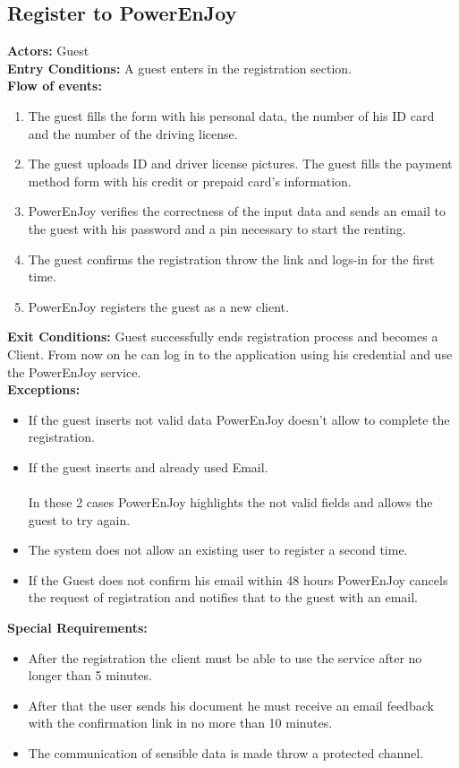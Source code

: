 \subsection{Register to PowerEnJoy}
%
\textbf{Actors:}
Guest\\
%
\textbf{Entry Conditions:}
A guest enters in the registration section.\\ 
%
\textbf{Flow of events:}
\begin{enumerate}
\item The guest fills the form with his personal data, the number of his ID card and the number of the driving license. 
\item The guest uploads ID and driver license pictures. The guest fills the payment method form with his credit or prepaid card's information. 
\item PowerEnJoy verifies the correctness of the input data and sends an email to the guest with his password and a pin necessary to start the renting. 
\item The guest confirms the registration throw the link and logs-in for the first time.
\item PowerEnJoy registers the guest as a new client. 
\end{enumerate}
%
\textbf{Exit Conditions:}
Guest successfully ends registration process and becomes a Client. From now on he can log in to the application using his credential and use the PowerEnJoy service. \\ 
%
\textbf{Exceptions:}
\begin{itemize}
\item If the guest inserts not valid data PowerEnJoy doesn't allow to complete the registration.
\item If the guest inserts and already used Email.
\\
\\In these 2 cases PowerEnJoy highlights the not valid fields and allows the guest to try again.
\item The system does not allow an existing user to register a second time.
\item If the Guest does not confirm his email within 48 hours PowerEnJoy cancels the request of registration and notifies that to the guest with an email.
\end{itemize}
%
\textbf{Special Requirements:}
\begin{itemize}
\item After the registration the client must be able to use the service after no longer than 5 minutes.
\item After that the user sends his document he must receive an email feedback with the confirmation link in no more than 10 minutes.
\item The communication of sensible data is made throw a protected channel.
\end{itemize}


